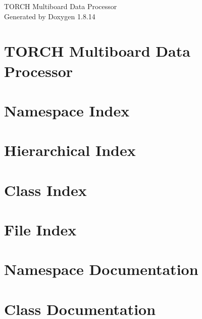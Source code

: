 \documentclass[twoside]{book}
\newcommand{\+}{\discretionary{\mbox{\scriptsize$\hookleftarrow$}}{}{}}
\newcommand{\clearemptydoublepage}{%
  \newpage{\pagestyle{empty}\cleardoublepage}%
}
\begin{document}
\hypersetup{pageanchor=false,
             bookmarksnumbered=true,
             pdfencoding=unicode
            }
\begin{titlepage}
\vspace*{7cm}
\begin{center}%
{\Large T\+O\+R\+CH Multiboard Data Processor }\\
\vspace*{1cm}
{\large Generated by Doxygen 1.8.14}\\
\end{center}
\end{titlepage}
\clearemptydoublepage
{}
\tableofcontents
\clearemptydoublepage
{}
\hypersetup{pageanchor=true}

\chapter{T\+O\+R\+CH Multiboard Data Processor}
\label{md__r_e_a_d_m_e}

\chapter{Namespace Index}

\chapter{Hierarchical Index}

\chapter{Class Index}

\chapter{File Index}

\chapter{Namespace Documentation}




\chapter{Class Documentation}


















\end{document}
